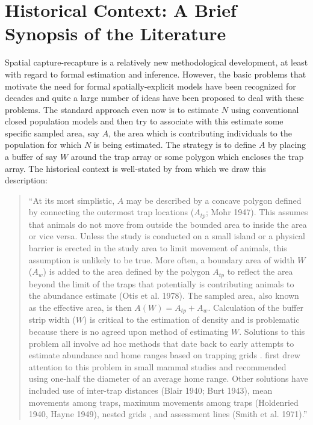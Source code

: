 \section{ Historical Context: A Brief Synopsis of the Literature}

Spatial capture-recapture is a relatively new methodological
development, at least with regard to formal estimation and
inference. However, the basic problems that motivate the need for
formal spatially-explicit models have been recognized for decades and
quite a large number of ideas have been proposed to deal with these
problems. The standard approach even now is to estimate $N$ using
conventional closed population models \citep{otis_etal:1978} and then
try to associate with this estimate some specific sampled area, say $A$,
the area which is contributing individuals to the population for which
$N$ is being estimated. The strategy is to define $A$ by placing a buffer
of say $W$ around the trap array or some polygon which encloses the trap
array. The historical context is well-stated by \citep{obrien:2011}
from which we draw this description:

\begin{quote}
  ``At its most simplistic, $A$ may be described by a concave polygon
  defined by connecting the outermost trap locations ($A_{tp}$; Mohr
  1947). This assumes that animals do not move from outside the
  bounded area to inside the area or vice versa. Unless the study is
  conducted on a small island or a physical barrier is erected in the
  study area to limit movement of animals, this assumption is unlikely
  to be true. More often, a boundary area of width $W$ ($A_{w}$) is added to
  the area defined by the polygon $A_{tp}$ to reflect the area beyond the
  limit of the traps that potentially is contributing animals to the
  abundance estimate (Otis et al. 1978). The sampled area, also known
  as the effective area, is then $A(W) = A_{tp} + A_{w}$. Calculation of the
  buffer strip width ($W$) is critical to the estimation of density and
  is problematic because there is no agreed upon method of estimating
  $W$. Solutions to this problem all involve ad hoc methods that date
  back to early attempts to estimate abundance and home ranges based
  on trapping grids 
  \citep[see][]{hayne:1949}. \citet{dice:1938} first drew attention
  to this problem in small mammal studies and recommended using
  one-half the diameter of an average home range. Other solutions have
  included use of inter-trap distances (Blair 1940; Burt 1943), mean
  movements among traps, maximum movements among traps (Holdenried
  1940, Hayne 1949), nested grids \citep{otis_etal:1978}, and assessment
  lines (Smith et al. 1971).''
\end{quote}

